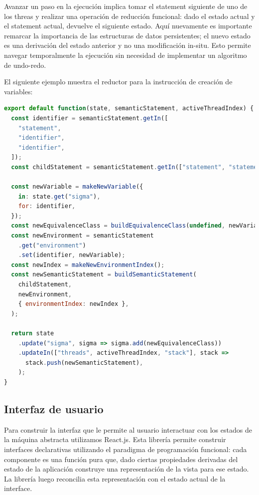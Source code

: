\documentclass[a4paper,11pt]{article}
\begin{document}
Avanzar un paso en la ejecución implica tomar el statement siguiente de uno de los threas y realizar una operación de reducción funcional\cite{fold}: dado el estado actual y el statement actual, devuelve el siguiente estado. Aquí nuevamente es importante remarcar la importancia de las estructuras de datos persistentes; el nuevo estado es una derivación del estado anterior y no una modificación in-situ. Esto permite navegar temporalmente la ejecución sin necesidad de implementar un algoritmo de undo-redo.

El siguiente ejemplo muestra el reductor para la instrucción de creación de variables:

\begin{lstlisting}[language=javascript]
export default function(state, semanticStatement, activeThreadIndex) {
  const identifier = semanticStatement.getIn([
    "statement",
    "identifier",
    "identifier",
  ]);
  const childStatement = semanticStatement.getIn(["statement", "statement"]);

  const newVariable = makeNewVariable({
    in: state.get("sigma"),
    for: identifier,
  });
  const newEquivalenceClass = buildEquivalenceClass(undefined, newVariable);
  const newEnvironment = semanticStatement
    .get("environment")
    .set(identifier, newVariable);
  const newIndex = makeNewEnvironmentIndex();
  const newSemanticStatement = buildSemanticStatement(
    childStatement,
    newEnvironment,
    { environmentIndex: newIndex },
  );

  return state
    .update("sigma", sigma => sigma.add(newEquivalenceClass))
    .updateIn(["threads", activeThreadIndex, "stack"], stack =>
      stack.push(newSemanticStatement),
    );
}
\end{lstlisting}


\subsection{Interfaz de usuario}

Para construir la interfaz que le permite al usuario interactuar con los estados de la máquina abstracta utilizamos React.js\cite{react}. Esta librería permite construir interfaces declarativas utilizando el paradigma de programación funcional: cada componente es una función pura que, dado ciertas propiedades derivadas del estado de la aplicación construye una representación de la vista para ese estado. La librería luego reconcilia esta representación con el estado actual de la interface.
\end{document}
